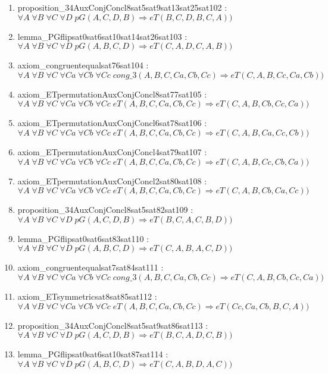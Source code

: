 \documentclass{article}
\begin{document}
\begin{enumerate}
\item proposition\_34AuxConjConcl8sat5sat9sat13sat25sat102 : $\forall A\;\forall B\;\forall C\;\forall D\;pG(A, C, D, B) \Rightarrow eT(B, C, D, B, C, A))$
\item lemma\_PGflipsat0sat6sat10sat14sat26sat103 : $\forall A\;\forall B\;\forall C\;\forall D\;pG(A, B, C, D) \Rightarrow eT(C, A, D, C, A, B))$
\item axiom\_congruentequalsat76sat104 : $\forall A\;\forall B\;\forall C\;\forall Ca\;\forall Cb\;\forall Cc\;cong\_3(A, B, C, Ca, Cb, Cc) \Rightarrow eT(C, A, B, Cc, Ca, Cb))$
\item axiom\_ETpermutationAuxConjConcl8sat77sat105 : $\forall A\;\forall B\;\forall C\;\forall Ca\;\forall Cb\;\forall Cc\;eT(A, B, C, Ca, Cb, Cc) \Rightarrow eT(C, A, B, Cb, Cc, Ca))$
\item axiom\_ETpermutationAuxConjConcl6sat78sat106 : $\forall A\;\forall B\;\forall C\;\forall Ca\;\forall Cb\;\forall Cc\;eT(A, B, C, Ca, Cb, Cc) \Rightarrow eT(C, A, B, Ca, Cc, Cb))$
\item axiom\_ETpermutationAuxConjConcl4sat79sat107 : $\forall A\;\forall B\;\forall C\;\forall Ca\;\forall Cb\;\forall Cc\;eT(A, B, C, Ca, Cb, Cc) \Rightarrow eT(C, A, B, Cc, Cb, Ca))$
\item axiom\_ETpermutationAuxConjConcl2sat80sat108 : $\forall A\;\forall B\;\forall C\;\forall Ca\;\forall Cb\;\forall Cc\;eT(A, B, C, Ca, Cb, Cc) \Rightarrow eT(C, A, B, Cb, Ca, Cc))$
\item proposition\_34AuxConjConcl8sat5sat82sat109 : $\forall A\;\forall B\;\forall C\;\forall D\;pG(A, C, D, B) \Rightarrow eT(B, C, A, C, B, D))$
\item lemma\_PGflipsat0sat6sat83sat110 : $\forall A\;\forall B\;\forall C\;\forall D\;pG(A, B, C, D) \Rightarrow eT(C, A, B, A, C, D))$
\item axiom\_congruentequalsat7sat84sat111 : $\forall A\;\forall B\;\forall C\;\forall Ca\;\forall Cb\;\forall Cc\;cong\_3(A, B, C, Ca, Cb, Cc) \Rightarrow eT(C, A, B, Cb, Cc, Ca))$
\item axiom\_ETsymmetricsat8sat85sat112 : $\forall A\;\forall B\;\forall C\;\forall Ca\;\forall Cb\;\forall Cc\;eT(A, B, C, Ca, Cb, Cc) \Rightarrow eT(Cc, Ca, Cb, B, C, A))$
\item proposition\_34AuxConjConcl8sat5sat9sat86sat113 : $\forall A\;\forall B\;\forall C\;\forall D\;pG(A, C, D, B) \Rightarrow eT(B, C, A, D, C, B))$
\item lemma\_PGflipsat0sat6sat10sat87sat114 : $\forall A\;\forall B\;\forall C\;\forall D\;pG(A, B, C, D) \Rightarrow eT(C, A, B, D, A, C))$

\end{enumerate}
\end{document}
